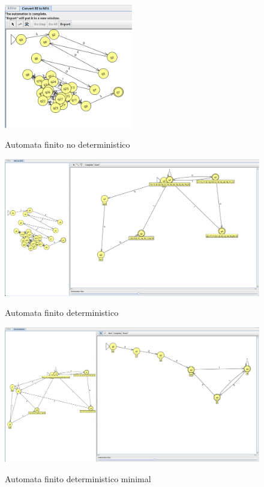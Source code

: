 \documentclass{article}
\begin{document}
        \begin{figure}[!h]
            \centering
            \includegraphics[width=0.5\textwidth]{./Imagenes/image21.png}
            \label{fig:label4}
            \caption{Automata finito no deterministico}
        \end{figure}

        \newpage

        \begin{figure}[!h]
            \centering
            \includegraphics[width=1.2\textwidth]{./Imagenes/image22.png}
            \label{fig:label4}
            \caption{Automata finito  deterministico}
        \end{figure}

        \begin{figure}[!h]
            \centering
            \includegraphics[width=1.2\textwidth]{./Imagenes/image23.png}
            \label{fig:label4}
            \caption{Automata finito deterministico minimal}
        \end{figure}
\end{document}
